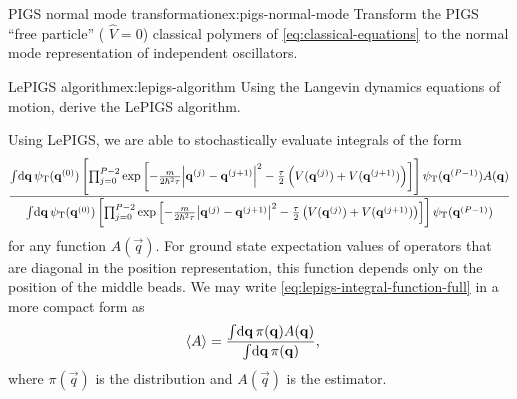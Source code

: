 \begin{DefExercise}{PIGS normal mode transformation}{ex:pigs-normal-mode}
	Transform the PIGS ``free particle'' (\ie{} $\hat{V} = 0$) classical polymers of \cref{eq:classical-equations} to the normal mode representation of independent oscillators.
\end{DefExercise}

\begin{DefExercise}{LePIGS algorithm}{ex:lepigs-algorithm}
	Using the Langevin dynamics equations of motion, derive the LePIGS algorithm.
\end{DefExercise}

Using LePIGS, we are able to stochastically evaluate integrals of the form
\begin{align}
	\frac{
		\int\! \dif \vec{q} \,
			\psiT(\vec{q}\bead{0})
			\left[ \prod_{j=0}^{P-2} \expb{
				-\frac{m}{2 \hbar^2 \tau} \abs{\vec{q}\bead{j} - \vec{q}\bead{j+1}}^2
				- \frac{\tau}{2} \left( V(\vec{q}\bead{j}) + V(\vec{q}\bead{j+1}) \right)
			} \right]
			\psiT(\vec{q}\bead{P-1})
			A(\vec{q})
	}{
		\int\! \dif \vec{q} \,
			\psiT(\vec{q}\bead{0})
			\left[ \prod_{j=0}^{P-2} \expb{
				-\frac{m}{2 \hbar^2 \tau} \abs{\vec{q}\bead{j} - \vec{q}\bead{j+1}}^2
				- \frac{\tau}{2} \left( V(\vec{q}\bead{j}) + V(\vec{q}\bead{j+1}) \right)
			} \right]
			\psiT(\vec{q}\bead{P-1})
	}
		\label{eq:lepigs-integral-function-full}
\end{align}
for any function $A(\vec{q})$.
For ground state expectation values of operators that are diagonal in the position representation, this function depends only on the position of the middle beads.
We may write \cref{eq:lepigs-integral-function-full} in a more compact form as
\begin{align}
	\mean{A}
	&= \frac{
			\int\! \dif \vec{q} \, \pi(\vec{q}) A(\vec{q})
		}{
			\int\! \dif \vec{q} \, \pi(\vec{q})
		},
			\label{eq:lepigs-integral-function}
\end{align}
where $\pi(\vec{q})$ is the distribution and $A(\vec{q})$ is the estimator.
